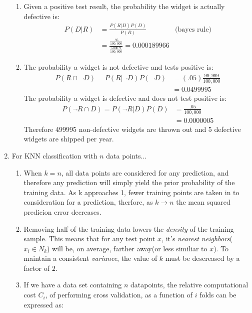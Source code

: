 \documentclass{report}
\begin{document}
\begin{enumerate}
	     
	    \begin{enumerate}[label=(\alph*)]
		\item Given a positive test result, the probability the widget is actually defective is:
	 	\begin{align*}
	 	 P(D \vert R)	&= \frac{P(R \vert D)P(D)}{P(R)} & \text{(bayes rule)} \\
	 	 				&= \frac{\frac{.95}{100,000}}{\frac{5000.9}{100,000}}
	 	 				 = \mathbf{0.000189966}
	    \end{align*}
		\item The probability a widget is not defective and tests positive is:
		\begin{align*}
		P(R \cap \lnot D) = P(R \vert \lnot D)P(\lnot D) 	&= (.05)\frac{99,999}{100,000} \\
															&= 0.0499995
		\end{align*}
		The probability a widget is defective and does not test positive is:
		\begin{align*}
		P(\lnot R \cap D) = P(\lnot R \vert  D)P(D) 	&= \frac{.05}{100,000} \\
														&= 0.0000005
		\end{align*}
		Therefore 499995 non-defective widgets are thrown out and 5 defective widgets are shipped per year.
		\end{enumerate}
		\item For KNN classification with $n$ data points...
		\begin{enumerate}
			\item When $k = n$, all data points are considered for any prediction, and therefore any prediction will simply yield the prior probability of the training data. As k approaches 1, fewer training points are taken in to consideration for a prediction, therfore, as $k \rightarrow n$ the mean squared predicion error decreases.
			\item  Removing half of the training data lowers the \textit{density} of the training sample. This means that for any test point $x$, it's \textit{nearest neighbors}($x_i \in N_k$) will be, on average, farther away(or less similiar to $x$). To maintain a consistent \textit{variance}, the value of $k$ must be descreased by a factor of $2$. 
			
			\item If we have a data set containing $n$ datapoints, the relative computational cost $C_i$, of performing cross validation, as a function of $i$ folds can be expressed as:
			

\end{enumerate}
\end{enumerate}
\end{document}
